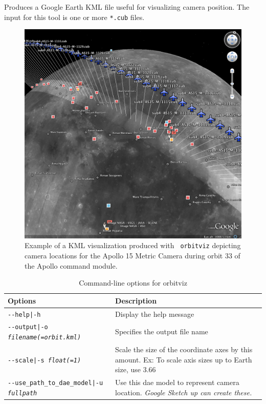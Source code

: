 Produces a Google Earth \ac{KML} file useful for visualizing camera
position. The input for this tool is one or more \texttt{*.cub} files.

\begin{figure}[!b]
  \begin{center}
  \includegraphics[width=6in]{images/orbitviz_ge_result.png}
  \end{center}
  \caption{ Example of a \ac{KML} visualization produced with {\tt
      orbitviz} depicting camera locations for the Apollo 15 Metric
    Camera during orbit 33 of the Apollo command module.}
  \label{fig:orbitviz_example}
\end{figure}

\begin{longtable}{|l|p{10cm}|}
\caption{Command-line options for orbitviz}
\label{tbl:orbitviz}
\endfirsthead
\endhead
\endfoot
\endlastfoot
\hline
Options & Description \\ \hline \hline
\texttt{-\/-help|-h} & Display the help message\\ \hline
\texttt{-\/-output|-o \textit{filename(=orbit.kml)}} & Specifies the output file name \\ \hline
\texttt{-\/-scale|-s \textit{float(=1)}} & Scale the size of the coordinate axes by this amount. Ex: To scale axis sizes up to Earth size, use 3.66 \\ \hline
\texttt{-\/-use\_path\_to\_dae\_model|-u \textit{fullpath}} & Use this dae model to represent camera location. \emph{Google Sketch up can create these.} \\ \hline
\end{longtable}

